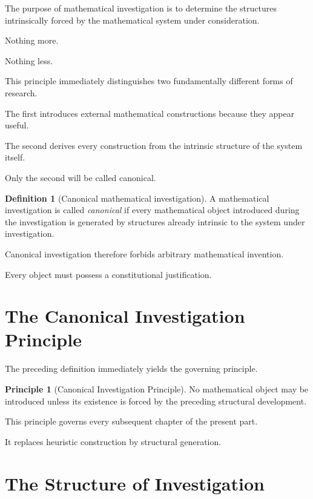 \documentclass[13pt,openany]{book}
\theoremstyle{plain}
\theoremstyle{definition}
\newtheorem{definition}{Definition}[chapter]
\newtheorem{principle}{Principle}[chapter]
\begin{document}
The purpose of mathematical investigation is to determine the structures
intrinsically forced by the mathematical system under consideration.

Nothing more.

Nothing less.

This principle immediately distinguishes two fundamentally different forms of
research.

The first introduces external mathematical constructions because they appear
useful.

The second derives every construction from the intrinsic structure of the
system itself.

Only the second will be called canonical.

\begin{definition}[Canonical mathematical investigation]
A mathematical investigation is called \emph{canonical} if every mathematical
object introduced during the investigation is generated by structures already
intrinsic to the system under investigation.
\end{definition}

Canonical investigation therefore forbids arbitrary mathematical invention.

Every object must possess a constitutional justification.

\section{The Canonical Investigation Principle}

The preceding definition immediately yields the governing principle.

\begin{principle}[Canonical Investigation Principle]
No mathematical object may be introduced unless its existence is forced by the
preceding structural development.
\end{principle}

This principle governs every subsequent chapter of the present part.

It replaces heuristic construction by structural generation.

\section{The Structure of Investigation}
\end{document}
